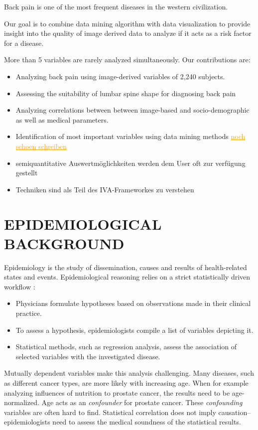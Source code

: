 \documentclass[a4paper,twoside]{style/article}
\newcommand{\com}[1]{\textcolor{orange}{\uline{#1}}}
\begin{document}
Back pain is one of the most frequent diseases in the western civilization.

Our goal is to combine data mining algorithm with data visualization to provide insight into the quality of image derived data to analyze if it acts as a risk factor for a disease.

More than 5 variables are rarely analyzed simultaneously.
Our contributions are:
\begin{itemize}
	\item Analyzing back pain using image-derived variables of 2,240 subjects.
	\item Assessing the suitability of lumbar spine shape for diagnosing back pain
	\item Analyzing correlations between between image-based and socio-demographic as well as medical parameters.
	\item Identification of most important variables using data mining methods \com{noch schoen schreiben}
	\item semiquantitative Auswertmöglichkeiten werden dem User oft zur verfügung gestellt
	\item Techniken sind als Teil des IVA-Frameworkes zu verstehen
\end{itemize}

\section{\uppercase{Epidemiological Background}}
\label{sec:EpidemiologicalBackground}
\noindent Epidemiology is the study of dissemination, causes and results of health-related states and events.
Epidemiological reasoning relies on a strict statistically driven workflow \cite{Fletcher}:
\begin{itemize}
	\item Physicians formulate hypotheses based on observations made in their clinical practice.
	\item To assess a hypothesis, epidemiologists compile a list of variables depicting it.
	\item Statistical methods, such as regression analysis, assess the association of selected variables with the investigated disease.
\end{itemize}
Mutually dependent variables make this analysis challenging.
Many diseases, such as different cancer types, are more likely with increasing age.
When for example analyzing influences of nutrition to prostate cancer, the results need to be age-normalized.
Age acts as an \emph{confounder} for prostate cancer.
These \emph{confounding} variables are often hard to find.
Statistical correlation does not imply causation--epidemiologists need to assess the medical soundness of the statistical results.
\end{document}
